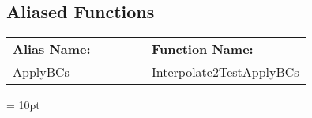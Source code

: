 \documentclass{article}
\begin{document}
\subsection*{Aliased Functions}

\hspace{5mm}

 \begin{tabular*}{160mm}{ll} 

{\bf Alias Name:} ~~~~~~~ & {\bf Function Name:} \\ 
ApplyBCs & Interpolate2TestApplyBCs \\ 
\end{tabular*} 



\vspace{5mm}\parskip = 10pt 
\end{document}
